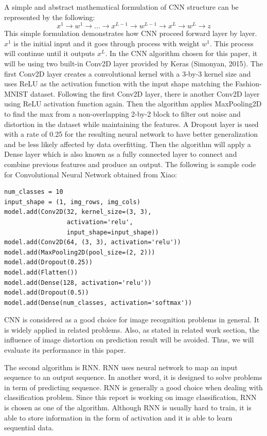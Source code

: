 \documentclass[letterpaper]{article} %
\begin{document}
A simple and abstract mathematical formulation of CNN structure can be represented by the following:
$$x^1\rightarrow w^1 \rightarrow ... \rightarrow x^{L-1} \rightarrow w^{L-1} \rightarrow x^L \rightarrow w^L \rightarrow z$$
This simple formulation demonstrates how CNN proceed forward layer by layer. $x^1$ is the initial input and it goes through process with weight $w^1$. This process will continue until it outputs $x^{L}$. In the CNN algorithm chosen for this paper, it will be using two built-in Conv2D layer provided by Keras (Simonyan, 2015). The first Conv2D layer creates a convolutional kernel with a 3-by-3 kernel size and uses ReLU as the activation function with the input shape matching the Fashion-MNIST dataset. Following the first Conv2D layer, there is another Conv2D layer using ReLU activation function again. Then the algorithm applies MaxPooling2D to find the max from a non-overlapping 2-by-2 block to filter out noise and distortion in the dataset while maintaining the features. A Dropout layer is used with a rate of 0.25 for the resulting neural network to have better generalization and be less likely affected by data overfitting. Then the algorithm will apply a Dense layer which is also known as a fully connected layer to connect and combine previous features and produce an output. The following is sample code for Convolutional Neural Network obtained from Xiao:
\lstset{
numberstyle=\small, 
numbers=left,
numbersep=8pt, 
frame = single, 
language=Pascal, 
framexleftmargin=15pt}

\begin{lstlisting}[columns=fullflexible, keepspaces=true, stepnumber=1]
num_classes = 10
input_shape = (1, img_rows, img_cols)
model.add(Conv2D(32, kernel_size=(3, 3),
                 activation='relu',
                 input_shape=input_shape))
model.add(Conv2D(64, (3, 3), activation='relu'))
model.add(MaxPooling2D(pool_size=(2, 2)))
model.add(Dropout(0.25))
model.add(Flatten())
model.add(Dense(128, activation='relu'))
model.add(Dropout(0.5))
model.add(Dense(num_classes, activation='softmax'))
\end{lstlisting}
CNN is considered as a good choice for image recognition problems in general. It is widely applied in related problems. Also, as stated in related work section, the influence of image distortion on prediction result will be avoided. Thus, we will evaluate its performance in this paper.

The second algorithm is RNN. RNN 	uses neural network to map an input sequence to an output sequence. In another word, it is designed to solve problems in term of predicting sequence. RNN is generally a good choice when dealing with classification problem. Since this report is working on image classification, RNN is chosen as one of the algorithm. Although RNN is usually hard to train, it is able to store information in the form of activation and it is able to learn sequential data.
\end{document}
